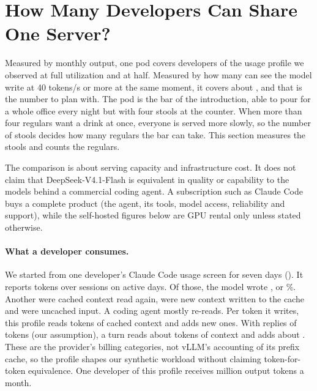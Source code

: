 \section{How Many Developers Can Share One Server?}\label{sec:agent}

Measured by monthly output, one pod covers  developers of the usage profile we
observed at full utilization and  at half. Measured by how many can see the model
write at 40 tokens/s or more at the same moment, it covers about , and that is the
number to plan with. The pod is the bar of the introduction, able to pour for a whole office every night but with four
stools at the counter. When more than four regulars want a drink at once, everyone is served more slowly, so the
number of stools decides how many regulars the bar can take. This section measures the stools and counts the
regulars.

The comparison is about serving capacity and infrastructure cost. It does not claim that DeepSeek-V4.1-Flash is
equivalent in quality or capability to the models behind a commercial coding agent. A subscription such as Claude
Code buys a complete product (the agent, its tools, model access, reliability and support), while the self-hosted
figures below are GPU rental only unless stated otherwise.

\paragraph{What a developer consumes.}
We started from one developer's Claude Code usage screen for seven days ().
It reports  tokens over  sessions on
 active days. Of those, the model wrote , or
\%. Another  were cached context read again,
 were new context written to the cache and  were
uncached input. A coding agent mostly re-reads. Per token it writes, this profile reads
 tokens of cached context and adds  new ones. With
replies of  tokens (our assumption), a turn reads about  tokens of
context and adds about . These are the provider's billing categories, not vLLM's accounting
of its prefix cache, so the profile shapes our synthetic workload without claiming token-for-token equivalence. One
developer of this profile receives  million output tokens a month.

